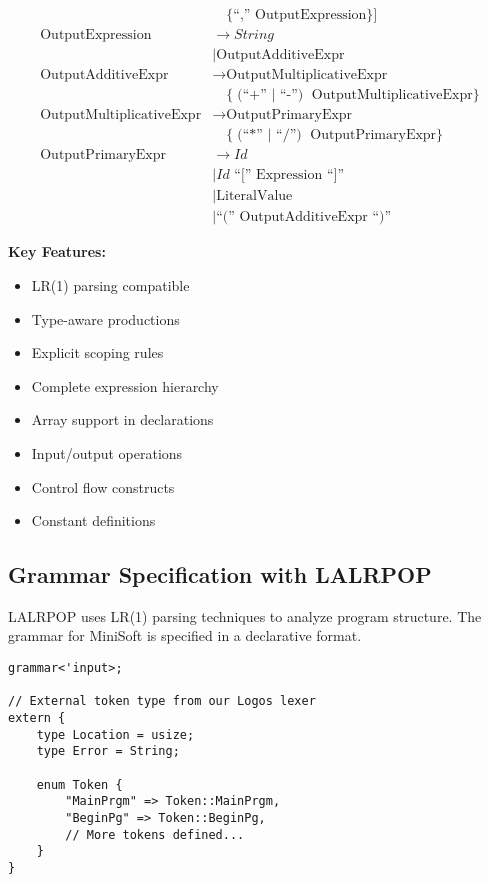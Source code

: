 \documentclass[12pt,a4paper]{article}
\begin{document}
\begin{align*}
                         &\quad \{ \text{``,'' } \text{OutputExpression} \} ] \\
    \text{OutputExpression} &\rightarrow \mathit{String} \\
                          &\mid \text{OutputAdditiveExpr} \\
    \text{OutputAdditiveExpr} &\rightarrow \text{OutputMultiplicativeExpr} \\
                             &\quad \{ \text{(``+'' $\mid$ ``-'') } \text{OutputMultiplicativeExpr} \} \\
    \text{OutputMultiplicativeExpr} &\rightarrow \text{OutputPrimaryExpr} \\
                                  &\quad \{ \text{(``*'' $\mid$ ``/'') } \text{OutputPrimaryExpr} \} \\
    \text{OutputPrimaryExpr} &\rightarrow \mathit{Id} \\
                           &\mid \mathit{Id} \text{ ``['' } \text{Expression} \text{ ``]''} \\
                           &\mid \text{LiteralValue} \\
                           &\mid \text{``('' } \text{OutputAdditiveExpr} \text{ ``)''}
    \end{align*}
    
    
    \noindent\textbf{Key Features:}
    \begin{itemize}
        \item LR(1) parsing compatible
        \item Type-aware productions
        \item Explicit scoping rules
        \item Complete expression hierarchy
        \item Array support in declarations
        \item Input/output operations
        \item Control flow constructs
        \item Constant definitions
    \end{itemize}


\subsection{Grammar Specification with LALRPOP}
LALRPOP uses LR(1) parsing techniques to analyze program structure. The grammar for MiniSoft is specified in a declarative format.

\begin{lstlisting}[caption={Grammar File Structure}]
grammar<'input>;

// External token type from our Logos lexer
extern {
    type Location = usize;
    type Error = String;

    enum Token {
        "MainPrgm" => Token::MainPrgm,
        "BeginPg" => Token::BeginPg,
        // More tokens defined...
    }
}
\end{lstlisting}
\end{document}
